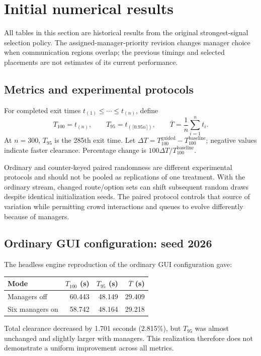 \documentclass[11pt]{article}
\begin{document}
\section{Initial numerical results}
All tables in this section are historical results from the original
strongest-signal selection policy. The assigned-manager-priority revision
changes manager choice when communication regions overlap; the previous
timings and selected placements are not estimates of its current performance.
\subsection{Metrics and experimental protocols}
For completed exit times $t_{(1)}\leq\cdots\leq t_{(n)}$, define
\[
 T_{100}=t_{(n)},\qquad T_{95}=t_{(\lceil0.95n\rceil)},\qquad
 \overline T=\frac1n\sum_{i=1}^{n}t_i.
\]
At $n=300$, $T_{95}$ is the 285th exit time. Let
$\Delta T=T_{100}^{\mathrm{guided}}-T_{100}^{\mathrm{baseline}}$; negative
values indicate faster clearance. Percentage change is
$100\Delta T/T_{100}^{\mathrm{baseline}}$.

Ordinary and counter-keyed paired randomness are different experimental
protocols and should not be pooled as replications of one treatment. With the
ordinary stream, changed route/option sets can shift subsequent random draws
despite identical initialization seeds. The paired protocol controls that
source of variation while permitting crowd interactions and queues to evolve
differently because of managers.

\subsection{Ordinary GUI configuration: seed 2026}
The headless engine reproduction of the ordinary GUI configuration gave:
\begin{center}
\begin{tabular}{lrrr}
\toprule
Mode & $T_{100}$ (s) & $T_{95}$ (s) & $\overline T$ (s)\\
\midrule
Managers off & 60.443 & 48.149 & 29.409\\
Six managers on & 58.742 & 48.164 & 29.218\\
\bottomrule
\end{tabular}
\end{center}
Total clearance decreased by 1.701 seconds (2.815\%), but $T_{95}$ was almost
unchanged and slightly larger with managers. This realization therefore does
not demonstrate a uniform improvement across all metrics.
\end{document}
